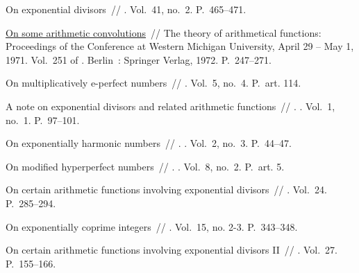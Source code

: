 \documentclass[12pt,a4paper]{article}
\begin{document}
\begin{thebibliography}{10}
 On exponential divisors~//
  \href{http://dx.doi.org/10.1215/S0012-7094-74-04152-0}{} \BibDash
{}. \BibDash
\newblock Vol.~41, no.~2. \BibDash
\newblock P.~465--471.

 \href{http://dx.doi.org/10.1007/BFb0058796}{On some
  arithmetic convolutions}~// The theory of arithmetical functions: Proceedings
  of the Conference at Western Michigan University, April 29 – May 1, 1971.
  \BibDash
\newblock Vol.~251 of . \BibDash
\newblock Berlin~: Springer Verlag, 1972. \BibDash
\newblock P.~247--271.

 On multiplicatively e-perfect numbers~//  \BibDash
{}. \BibDash
\newblock Vol.~5, no.~4. \BibDash
\newblock P.~art. 114.

 A note on exponential divisors and related arithmetic
  functions~// . \BibDash
{}. \BibDash
\newblock Vol.~1, no.~1. \BibDash
\newblock P.~97--101.

 On exponentially harmonic numbers~// .
  \BibDash
{}. \BibDash
\newblock Vol.~2, no.~3. \BibDash
\newblock P.~44--47.

 On modified hyperperfect numbers~//
  . \BibDash
{}. \BibDash
\newblock Vol.~8, no.~2. \BibDash
\newblock P.~art. 5.

 On certain arithmetic functions involving exponential
  divisors~// 
  \BibDash
{}. \BibDash
\newblock Vol.~24. \BibDash
\newblock P.~285--294.

 On exponentially coprime integers~//  \BibDash
{}. \BibDash
\newblock Vol.~15, no. 2-3. \BibDash
\newblock P.~343--348.

 On certain arithmetic functions involving exponential
  divisors II~//  \BibDash
{}. \BibDash
\newblock Vol.~27. \BibDash
\newblock P.~155--166.


\end{thebibliography}
\end{document}
